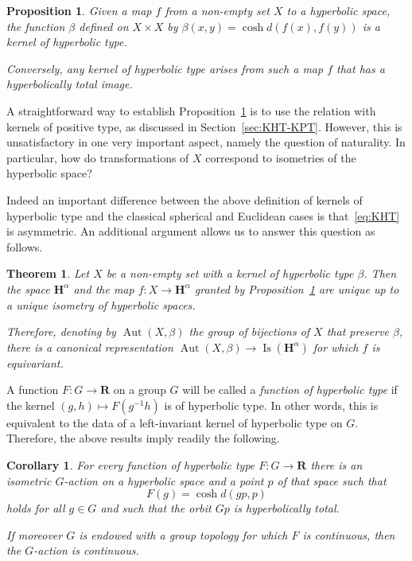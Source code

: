 \documentclass[11pt]{article}
\newtheorem{theorem}[theo]{Theorem}
\newtheorem{prop}[theo]{Proposition}
\newtheorem{coro}[theo]{Corollary}
\theoremstyle{definition}
\numberwithin{equation}{section}
\numberwithin{figure}{section}
\numberwithin{table}{section}
\newcommand{\RR}{\mathbf{R}}
\newcommand{\HH}{\mathbf{H}}
\DeclareMathOperator{\Isom}{Is}
\DeclareMathOperator{\Aut}{Aut}
\newcommand{\inv}{^{-1}}
\begin{document}
\begin{prop}\label{prop:KHT}
Given a map $f$ from a non-empty set $X$ to a hyperbolic space, the function $\beta$ defined on $X\times X$ by $\beta(x,y)=\cosh d(f(x),f(y))$ is a kernel of hyperbolic type.

Conversely, any kernel of hyperbolic type arises from such a map $f$ that has a hyperbolically total image.
\end{prop}

A straightforward way to establish Proposition~\ref{prop:KHT} is to use the relation with kernels of positive type, as discussed in Section~\ref{sec:KHT-KPT}. However, this is unsatisfactory in one very important aspect, namely the question of naturality. In particular, how do transformations of $X$ correspond to isometries of the hyperbolic space?

Indeed an important difference between the above definition of kernels of hyperbolic type and the classical spherical and Euclidean cases is that~\eqref{eq:KHT} is asymmetric. An additional argument allows us to answer this question as follows.

\begin{theorem}\label{thm:KHT-char}
Let $X$ be a non-empty set with a kernel of hyperbolic type $\beta$. Then the space $\HH^\alpha$ and the map $f\colon X\to \HH^\alpha$ granted by Proposition~\ref{prop:KHT} are unique up to a unique isometry of hyperbolic spaces.

Therefore, denoting by $\Aut(X,\beta)$ the group of bijections of $X$ that preserve $\beta$, there is a canonical representation $\Aut(X,\beta) \to \Isom(\HH^\alpha)$ for which $f$ is equivariant.
\end{theorem}

A function $F\colon G \to \RR$ on a group $G$ will be called a \emph{function of hyperbolic type} if the kernel $(g,h)\mapsto F(g\inv h)$ is of hyperbolic type. In other words, this is equivalent to the data of a left-invariant kernel of hyperbolic type on $G$. Therefore, the above results imply readily the following.

\begin{coro}\label{cor:KHT-group}
For every function of hyperbolic type $F\colon G \to \RR$ there is an isometric $G$-action on a hyperbolic space and a point $p$ of that space such that
\[
F(g) = \cosh d(gp, p)
\]
holds for all $g\in G$ and such that the orbit $G p$ is hyperbolically total.

If moreover $G$ is endowed with a group topology for which $F$ is continuous, then the $G$-action is continuous.
\end{coro}
\end{document}
